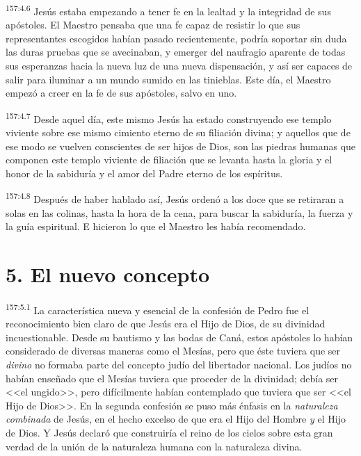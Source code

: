 \par 
\textsuperscript{157:4.6} Jesús estaba empezando a tener fe en la lealtad y la integridad de sus apóstoles. El Maestro pensaba que una fe capaz de resistir lo que sus representantes escogidos habían pasado recientemente, podría soportar sin duda las duras pruebas que se avecinaban, y emerger del naufragio aparente de todas sus esperanzas hacia la nueva luz de una nueva dispensación, y así ser capaces de salir para iluminar a un mundo sumido en las tinieblas. Este día, el Maestro empezó a creer en la fe de sus apóstoles, salvo en uno.

\par 
\textsuperscript{157:4.7} Desde aquel día, este mismo Jesús ha estado construyendo ese templo viviente sobre ese mismo cimiento eterno de su filiación divina; y aquellos que de ese modo se vuelven conscientes de ser hijos de Dios, son las piedras humanas que componen este templo viviente de filiación que se levanta hasta la gloria y el honor de la sabiduría y el amor del Padre eterno de los espíritus.

\par 
\textsuperscript{157:4.8} Después de haber hablado así, Jesús ordenó a los doce que se retiraran a solas en las colinas, hasta la hora de la cena, para buscar la sabiduría, la fuerza y la guía espiritual. E hicieron lo que el Maestro les había recomendado.

\section*{5. El nuevo concepto}
\par 
\textsuperscript{157:5.1} La característica nueva y esencial de la confesión de Pedro fue el reconocimiento bien claro de que Jesús era el Hijo de Dios, de su divinidad incuestionable. Desde su bautismo y las bodas de Caná, estos apóstoles lo habían considerado de diversas maneras como el Mesías, pero que éste tuviera que ser \textit{divino} no formaba parte del concepto judío del libertador nacional. Los judíos no habían enseñado que el Mesías tuviera que proceder de la divinidad; debía ser <<el ungido>>, pero difícilmente habían contemplado que tuviera que ser <<el Hijo de Dios>>. En la segunda confesión se puso más énfasis en la \textit{naturaleza} \textit{combinada} de Jesús, en el hecho excelso de que era el Hijo del Hombre \textit{y} el Hijo de Dios. Y Jesús declaró que construiría el reino de los cielos sobre esta gran verdad de la unión de la naturaleza humana con la naturaleza divina.


